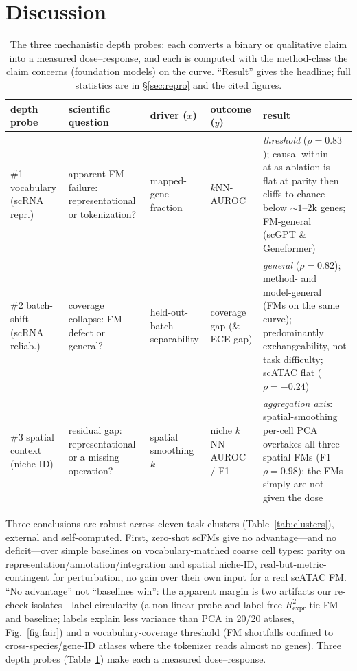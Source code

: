 \documentclass[journal]{IEEEtran}
\begin{document}
\section{Discussion}
\begin{table}[!tbp]\centering\footnotesize
\caption{The three mechanistic depth probes: each converts a binary or qualitative claim into a measured dose--response, and each is computed with the method-class the claim concerns (foundation models) on the curve. ``Result'' gives the headline; full statistics are in \S\ref{sec:repro} and the cited figures.}\label{tab:probes}
\begin{tabular}{@{}>{\raggedright\arraybackslash}p{1.9cm} >{\raggedright\arraybackslash}p{2.9cm} >{\raggedright\arraybackslash}p{2.0cm} >{\raggedright\arraybackslash}p{1.9cm} >{\raggedright\arraybackslash}p{4.5cm}@{}}
\toprule
depth probe & scientific question & driver ($x$) & outcome ($y$) & result \\
\midrule
\#1 vocabulary (scRNA repr.) & apparent FM failure: representational or tokenization? & mapped-gene fraction & $k$NN-AUROC & \emph{threshold} ($\rho{=}0.83$); causal within-atlas ablation is flat at parity then cliffs to chance below ${\sim}1$--$2$k genes; FM-general (scGPT \& Geneformer) \\[2pt]
\#2 batch-shift (scRNA reliab.) & coverage collapse: FM defect or general? & held-out-batch separability & coverage gap (\& ECE gap) & \emph{general} ($\rho{=}0.82$); method- and model-general (FMs on the same curve); predominantly exchangeability, not task difficulty; scATAC flat ($\rho{=}{-}0.24$) \\[2pt]
\#3 spatial context (niche-ID) & residual gap: representational or a missing operation? & spatial smoothing $k$ & niche $k$NN-AUROC / F1 & \emph{aggregation axis}: spatial-smoothing per-cell PCA overtakes all three spatial FMs (F1 $\rho{=}0.98$); the FMs simply are not given the dose \\
\bottomrule
\end{tabular}
\end{table}

Three conclusions are robust across eleven task clusters (Table~\ref{tab:clusters}), external and self-computed. First, zero-shot scFMs give no advantage---and no deficit---over simple baselines on vocabulary-matched coarse cell types: parity on representation/annotation/integration and spatial niche-ID, real-but-metric-contingent for perturbation, no gain over their own input for a real scATAC FM. ``No advantage'' not ``baselines win'': the apparent margin is two artifacts our re-check isolates---label circularity (a non-linear probe and label-free $R^2_{\mathrm{expr}}$ tie FM and baseline; labels explain less variance than PCA in 20/20 atlases, Fig.~\ref{fig:fair}) and a vocabulary-coverage threshold (FM shortfalls confined to cross-species/gene-ID atlases where the tokenizer reads almost no genes). Three depth probes (Table~\ref{tab:probes}) make each a measured dose--response.
\end{document}
